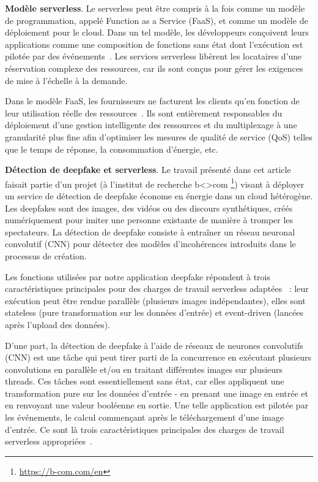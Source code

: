 \textbf{Modèle serverless}. Le serverless peut être compris à la fois comme un modèle de programmation, appelé Function as a Service (FaaS), et comme un modèle de déploiement pour le cloud. Dans un tel modèle, les développeurs conçoivent leurs applications comme une composition de fonctions sans état dont l'exécution est pilotée par des événements~\cite{SchleierSmith2021WhatSC}. 
Les services serverless libèrent les locataires d'une réservation complexe des ressources, car ils sont conçus pour gérer les exigences de mise à l'échelle à la demande.

Dans le modèle FaaS, les fournisseurs ne facturent les clients qu'en fonction de leur utilisation réelle des ressources~\cite{jonasCloudProgrammingSimplified2019}. Ils sont entièrement responsables du déploiement d'une gestion intelligente des ressources et du multiplexage à une granularité plus fine afin d'optimiser les mesures de qualité de service (QoS) telles que le temps de réponse, la consommation d'énergie, etc.

\textbf{Détection de deepfake et serverless}. Le travail présenté dans cet article faisait partie d'un projet (à l'institut de recherche b{\textless\textgreater}com \footnote{\href{https://b-com.com/en}{https://b-com.com/en}}) visant à déployer un service de détection de deepfake économe en énergie dans un cloud hétérogène. Les deepfakes sont des images, des vidéos ou des discours synthétiques, créés numériquement pour imiter une personne existante de manière à tromper les spectateurs. La détection de deepfake consiste à entraîner un réseau neuronal convolutif (CNN) pour détecter des modèles d'incohérences introduits dans le processus de création.

Les fonctions utilisées par notre application deepfake répondent à trois caractéristiques principales pour des charges de travail serverless adaptées~\cite{cncf2018whitepaper} : leur exécution peut être rendue parallèle (plusieurs images indépendantes), elles sont stateless (pure transformation sur les données d'entrée) et event-driven (lancées après l'upload des données).

D'une part, la détection de deepfake à l'aide de réseaux de neurones convolutifs (CNN) est une tâche qui peut tirer parti de la concurrence en exécutant plusieurs convolutions en parallèle et/ou en traitant différentes images sur plusieurs threads. Ces tâches sont essentiellement sans état, car elles appliquent une transformation pure sur les données d'entrée - en prenant une image en entrée et en renvoyant une valeur booléenne en sortie. Une telle application est pilotée par les événements, le calcul commençant après le téléchargement d'une image d'entrée. Ce sont là trois caractéristiques principales des charges de travail serverless appropriées~\cite{cncf2018whitepaper}.

